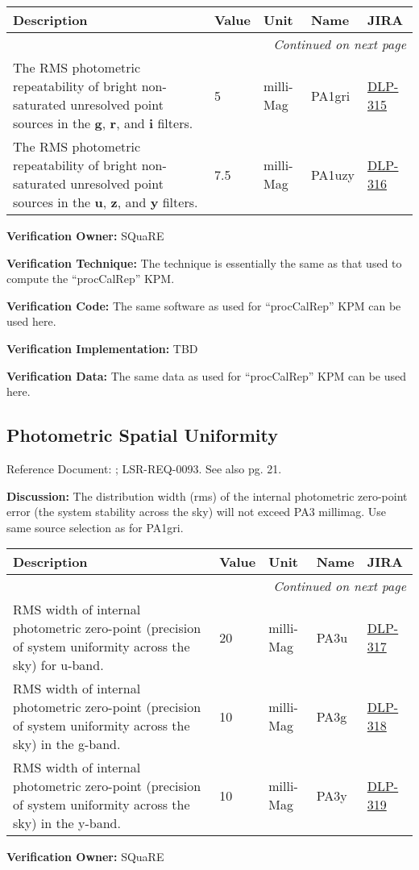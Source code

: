 \documentclass[DM,lsstdraft,toc]{lsstdoc}
\makeatletter
\newcommand{\jira}[1]{\href{https://jira.lsstcorp.org/browse/#1}{#1}}
\newenvironment{metric}[0]{%
\setlength\LTleft{0pt}
\setlength\LTright{\fill}
\begin{longtable}[]{@{}p{0.4\textwidth}lp{0.75in}p{1.3in}p{0.75in}@{}}

\hline \textbf{Description} & \textbf{Value} & \textbf{Unit} & \textbf{Name} & \textbf{JIRA} \\ \hline
\endhead

\hline \multicolumn{5}{r}{\emph{Continued on next page}} \\
\endfoot

\hline\hline
\endlastfoot
}{%
\hline
\end{longtable}
}
\makeatother
\begin{document}
\begin{metric}
The RMS photometric repeatability of bright non-saturated unresolved
point sources in the \textbf{g}, \textbf{r}, and \textbf{i} filters. & 5
& milli-Mag & PA1gri & \jira{DLP-315}\tabularnewline
The RMS photometric repeatability of bright non-saturated unresolved
point sources in the \textbf{u}, \textbf{z}, and \textbf{y} filters. &
7.5 & milli-Mag & PA1uzy & \jira{DLP-316}\tabularnewline
\end{metric}

\textbf{Verification Owner:} SQuaRE

\textbf{Verification Technique:} The technique is essentially the same
as that used to compute the ``procCalRep'' KPM.

\textbf{Verification Code:} The same software as used for ``procCalRep''
KPM can be used here.

\textbf{Verification Implementation:} TBD

\textbf{Verification Data:} The same data as used for ``procCalRep'' KPM
can be used here.

\subsection{Photometric Spatial
Uniformity}\label{photometric-spatial-uniformity}

Reference Document: ; LSR-REQ-0093. See also \SRD pg. 21.

\textbf{Discussion:} The distribution width (rms) of the internal
photometric zero-point error (the system stability across the sky) will
not exceed PA3 millimag. Use same source selection as for PA1gri.

\begin{metric}
RMS width of internal photometric zero-point (precision of system
uniformity across the sky) for u-band. & 20 & milli-Mag & PA3u &
\jira{DLP-317}\tabularnewline
RMS width of internal photometric zero-point (precision of system
uniformity across the sky) in the g-band. & 10 & milli-Mag & PA3g &
\jira{DLP-318}\tabularnewline
RMS width of internal photometric zero-point (precision of system
uniformity across the sky) in the y-band. & 10 & milli-Mag & PA3y &
\jira{DLP-319}\tabularnewline
\end{metric}

\textbf{Verification Owner:} SQuaRE
\end{document}
